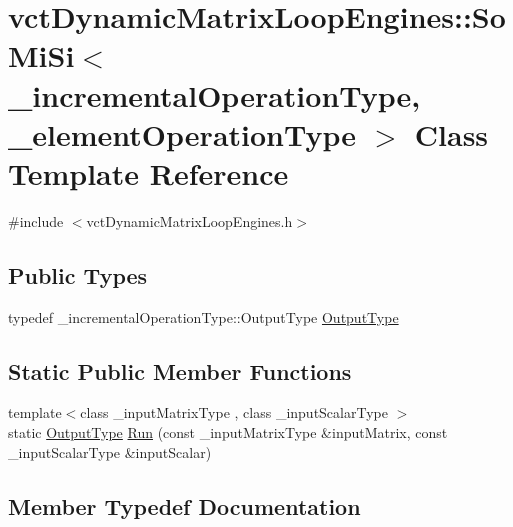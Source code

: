 \hypertarget{classvct_dynamic_matrix_loop_engines_1_1_so_mi_si}{}\section{vct\+Dynamic\+Matrix\+Loop\+Engines\+:\+:So\+Mi\+Si$<$ \+\_\+incremental\+Operation\+Type, \+\_\+element\+Operation\+Type $>$ Class Template Reference}
\label{classvct_dynamic_matrix_loop_engines_1_1_so_mi_si}


{\ttfamily \#include $<$vct\+Dynamic\+Matrix\+Loop\+Engines.\+h$>$}

\subsection*{Public Types}
\begin{DoxyCompactItemize}
\item 
typedef \+\_\+incremental\+Operation\+Type\+::\+Output\+Type \hyperlink{classvct_dynamic_matrix_loop_engines_1_1_so_mi_si_a29a40c7dfb4677d1bea0a6014e3ed579}{Output\+Type}
\end{DoxyCompactItemize}
\subsection*{Static Public Member Functions}
\begin{DoxyCompactItemize}
\item 
{\footnotesize template$<$class \+\_\+input\+Matrix\+Type , class \+\_\+input\+Scalar\+Type $>$ }\\static \hyperlink{classvct_dynamic_matrix_loop_engines_1_1_so_mi_si_a29a40c7dfb4677d1bea0a6014e3ed579}{Output\+Type} \hyperlink{classvct_dynamic_matrix_loop_engines_1_1_so_mi_si_aadb7b5e5d593ca08b3bc58bff1d78c3a}{Run} (const \+\_\+input\+Matrix\+Type \&input\+Matrix, const \+\_\+input\+Scalar\+Type \&input\+Scalar)
\end{DoxyCompactItemize}


\subsection{Member Typedef Documentation}
\hypertarget{classvct_dynamic_matrix_loop_engines_1_1_so_mi_si_a29a40c7dfb4677d1bea0a6014e3ed579}{}
